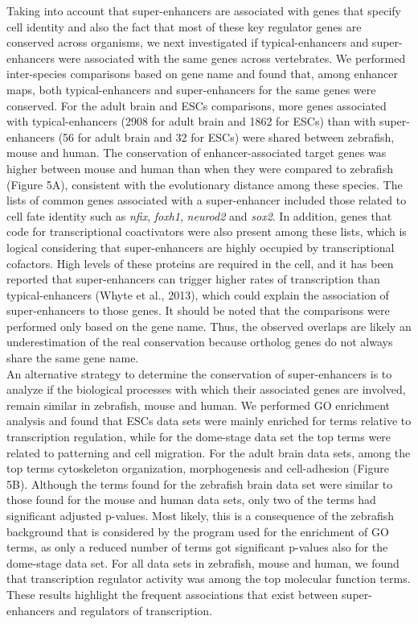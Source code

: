 		Taking into account that super-enhancers are associated with genes that specify cell identity and also the fact that most of these key regulator genes are conserved across organisms, we next investigated if typical-enhancers and super-enhancers were associated with the same genes across vertebrates. We performed inter-species comparisons based on gene name and found that, among enhancer maps, both typical-enhancers and super-enhancers for the same genes were conserved. For the adult brain and ESCs comparisons, more genes associated with typical-enhancers (2908 for adult brain and 1862 for ESCs) than with super-enhancers (56 for adult brain and 32 for ESCs) were shared between zebrafish, mouse and human. The conservation of enhancer-associated target genes was higher between mouse and human than when they were compared to zebrafish (Figure 5A), consistent with the evolutionary distance among these species. The lists of common genes associated with a super-enhancer included those related to cell fate identity such as \textit{nfix}, \textit{foxh1}, \textit{neurod2} and \textit{sox2}. In addition, genes that code for transcriptional coactivators were also present among these lists, which is logical considering that super-enhancers are highly occupied by transcriptional cofactors. High levels of these proteins are required in the cell, and it has been reported that super-enhancers can trigger higher rates of transcription than typical-enhancers (Whyte et al., 2013), which could explain the association of super-enhancers to those genes. It should be noted that the comparisons were performed only based on the gene name. Thus, the observed overlaps are likely an underestimation of the real conservation because ortholog genes do not always share the same gene name.\\

		An alternative strategy to determine the conservation of super-enhancers is to analyze if the biological processes with which their associated genes are involved, remain similar in zebrafish, mouse and human. We performed GO enrichment analysis and found that ESCs data sets were mainly enriched for terms relative to transcription regulation, while for the dome-stage data set the top terms were related to patterning and cell migration. For the adult brain data sets, among the top terms cytoskeleton organization, morphogenesis and cell-adhesion (Figure 5B). Although the terms found for the zebrafish brain data set were similar to those found for the mouse and human data sets, only two of the terms had significant adjusted p-values. Most likely, this is a consequence of the zebrafish background that is considered by the program used for the enrichment of GO terms, as only a reduced number of terms got significant p-values also for the dome-stage data set. For all data sets in zebrafish, mouse and human, we found that transcription regulator activity was among the top molecular function terms. These results highlight the frequent associations that exist between super-enhancers and regulators of transcription.\\

